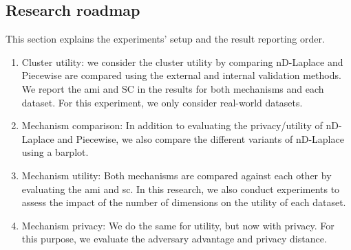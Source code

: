 \subsection{Research roadmap} \label{research-roadmap}
This section explains the experiments' setup and the result reporting order.
\begin{enumerate}
    \item Cluster utility: we consider the cluster utility by comparing nD-Laplace and Piecewise are compared using the external and internal validation methods.
          We report the \gls{ami} and SC in the results for both mechanisms and each dataset.
          For this experiment, we only consider real-world datasets.
    \item Mechanism comparison: In addition to evaluating the privacy/utility of nD-Laplace and Piecewise, we also compare the different variants of nD-Laplace using a barplot.
    \item Mechanism utility: Both mechanisms are compared against each other by evaluating the \gls{ami} and \gls{sc}.
          In this research, we also conduct experiments to assess the impact of the number of dimensions on the utility of each dataset.
    \item Mechanism privacy: We do the same for utility, but now with privacy.
          For this purpose, we evaluate the adversary advantage and privacy distance.

\end{enumerate}

